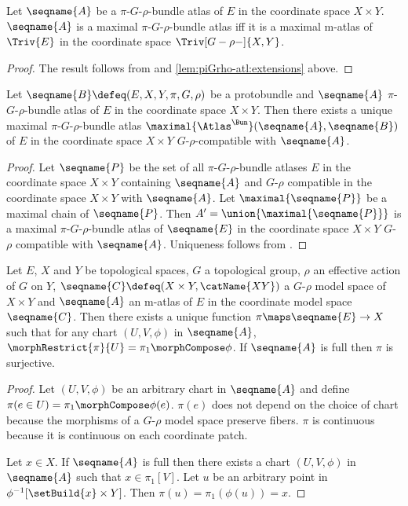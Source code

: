 \documentclass{article}
\begin{document}
\begin{lemma}
\label{lem:Bun-ATLmax}
Let $\seqname{A}$ be a $\pi$-$G$-$\rho$-bundle atlas of $E$ in the
coordinate space $X \times Y$. $\seqname{A}$ is a maximal
$\pi$-$G$-$\rho$-bundle atlas iff it is a maximal m-atlas of $\Triv{E}$
in the coordinate space $\Triv[G-\rho-]{X,Y}$.

\begin{proof}
The result follows from  and
{
  \showlabelsinline
  \cref{lem:piGrho-atl:extensions}
}
above.
\end{proof}
\end{lemma}

\begin{theorem}
Let $\seqname{B} \defeq (E, X, Y, \pi, G, \rho)$ be a protobundle and
$\seqname{A}$ $\pi$-$G$-$\rho$-bundle atlas of $E$ in the coordinate
space $X \times Y$. Then there exists a unique maximal
$\pi$-$G$-$\rho$-bundle atlas
$\maximal{\Atlas^\Bun}(\seqname{A},\seqname{B})$ of $E$ in the
coordinate space $X \times Y$ $G$-$\rho$-compatible with $\seqname{A}$.

\begin{proof}
Let $\seqname{P}$ be the set of all $\pi$-$G$-$\rho$-bundle atlases $E$
in the coordinate space $X \times Y$ containing $\seqname{A}$ and
$G$-$\rho$ compatible in the coordinate space $X \times Y$ with
$\seqname{A}$. Let $\maximal{\seqname{P}}$ be a maximal chain of
$\seqname{P}$. Then $A'=\union{\maximal{\seqname{P}}}$ is a maximal
$\pi$-$G$-$\rho$-bundle atlas of $\seqname{E}$ in the coordinate space
$X \times Y$ $G$-$\rho$ compatible with $\seqname{A}$. Uniqueness
follows from .
\end{proof}
\end{theorem}

\begin{lemma}
\label{lem:mGrho}
Let $E$, $X$ and $Y$ be topological spaces, $G$ a topological group,
$\rho$ an effective action of $G$ on $Y$,
$\seqname{C} \defeq (X \times Y, \catName{XY})$ a $G$-$\rho$ model space
of $X \times Y$ and $\seqname{A}$ an m-atlas of $E$ in the coordinate
model space $\seqname{C}$.  Then there exists a unique function
$\pi \maps \seqname{E} \to X$ such that for any chart $(U, V, \phi)$ in
$\seqname{A}$, $\morphRestrict{\pi}{U} = \pi_1 \morphCompose \phi$.   If
$\seqname{A}$ is full then $\pi$ is surjective.

\begin{proof}
Let $(U, V, \phi)$ be an arbitrary chart in $\seqname{A}$ and define
$\pi(e \in U) = \pi_1 \morphCompose \phi(e)$. $\pi(e)$ does not depend on the
choice of chart because the morphisms of a $G$-$\rho$ model space
preserve fibers. $\pi$ is continuous because it is continuous on each
coordinate patch.

Let $x \in X$. If $\seqname{A}$ is full then there exists a chart
$(U, V, \phi)$ in $\seqname{A}$ such that $x \in \pi_1[V]$. Let $u$ be an
arbitrary point in $\phi^{-1}[\setBuild{x} \times Y]$. Then
$\pi(u) = \pi_1(\phi(u)) = x$.
\end{proof}
\end{lemma}
\end{document}
